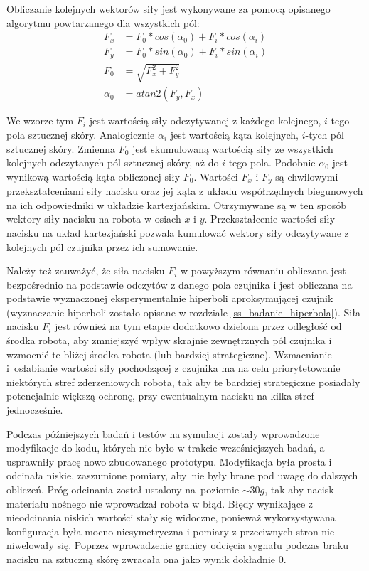 Obliczanie kolejnych wektorów siły jest wykonywane za pomocą opisanego algorytmu powtarzanego dla wszystkich pól:
\begin{align}
    F_x & = F_0 * cos(\alpha_0) + F_i * cos(\alpha_i) \\
    F_y & = F_0 * sin(\alpha_0) + F_i * sin(\alpha_i) \\
    F_0 & = \sqrt{F_x^2+F_y^2} \\
    \alpha_0 & = atan2(F_y,F_x)
\end{align}

We wzorze tym $F_i$ jest wartością siły odczytywanej z każdego kolejnego, $i$-tego pola sztucznej skóry. Analogicznie $\alpha_i$ jest wartością kąta kolejnych, $i$-tych pól sztucznej skóry. Zmienna $F_0$ jest skumulowaną wartością siły ze wszystkich kolejnych odczytanych pól sztucznej skóry, aż do $i$-tego pola. Podobnie $\alpha_0$ jest wynikową wartością kąta obliczonej siły $F_0$. Wartości $F_x$ i $F_y$ są chwilowymi przekształceniami siły nacisku oraz jej kąta z układu współrzędnych biegunowych na ich odpowiedniki w układzie kartezjańskim. Otrzymywane są w ten sposób wektory siły nacisku na robota w osiach $x$ i $y$. Przekształcenie wartości siły nacisku na układ kartezjański pozwala kumulować wektory siły odczytywane z kolejnych pól czujnika przez ich sumowanie.

Należy też zauważyć, że siła nacisku $F_i$ w powyższym równaniu obliczana jest bezpośrednio na podstawie odczytów z danego pola czujnika i jest obliczana na podstawie wyznaczonej eksperymentalnie hiperboli aproksymującej czujnik (wyznaczanie hiperboli zostało opisane w rozdziale \ref{ss_badanie_hiperbola}). Siła nacisku $F_i$ jest również na tym etapie dodatkowo dzielona przez odległość od środka robota, aby zmniejszyć wpływ skrajnie zewnętrznych pól czujnika i wzmocnić te bliżej środka robota (lub bardziej strategiczne). Wzmacnianie i~osłabianie wartości siły pochodzącej z czujnika ma na celu priorytetowanie niektórych stref zderzeniowych robota, tak aby te bardziej strategiczne posiadały potencjalnie większą ochronę, przy ewentualnym nacisku na kilka stref jednocześnie.

Podczas późniejszych badań i testów na symulacji zostały wprowadzone modyfikacje do kodu, których nie było w trakcie wcześniejszych badań, a usprawniły pracę nowo zbudowanego prototypu. Modyfikacja była prosta i odcinała niskie, zaszumione pomiary, aby~nie były brane pod uwagę do dalszych obliczeń. Próg odcinania został ustalony na~poziomie $\sim30g$, tak aby nacisk materiału nośnego nie wprowadzał robota w błąd. Błędy wynikające z nieodcinania niskich wartości stały się widoczne, ponieważ wykorzystywana konfiguracja była mocno niesymetryczna i pomiary z przeciwnych stron nie niwelowały się. Poprzez wprowadzenie granicy odcięcia sygnału podczas braku nacisku na sztuczną skórę zwracała ona jako wynik dokładnie $0$.

